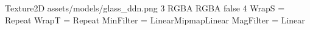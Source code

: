 Texture2D
assets/models/glass_ddn.png
3
RGBA
RGBA
false
4
WrapS = Repeat
WrapT = Repeat
MinFilter = LinearMipmapLinear
MagFilter = Linear
